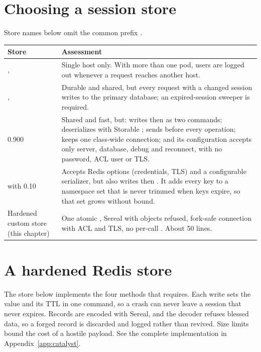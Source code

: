 \section{Choosing a session store}
Store names below omit the common prefix .
\begin{longtable}{L{.26\linewidth}L{.66\linewidth}}\toprule Store & Assessment \\ \midrule\endhead
{},  & Single host only. With more than one pod, users are logged out whenever a request reaches another host. \\
,  & Durable and shared, but every request with a changed session writes to the primary database; an expired-session sweeper is required. \\
 0.900 & Shared and fast, but: writes  then  as two commands; deserializes with Storable ; sends  before every operation; keeps one class-wide connection; and its configuration accepts only server, database, debug and reconnect, with no password, ACL user or TLS. \\
 with  0.10 & Accepts Redis options (credentials, TLS) and a configurable serializer, but also writes  then . It adds every key to a namespace set that is never trimmed when keys expire, so that set grows without bound. \\
Hardened custom store (this chapter) & One atomic , Sereal with objects refused, fork-safe connection with ACL and TLS, no per-call . About 50 lines. \\
\bottomrule\end{longtable}

\section{A hardened Redis store}
The store below implements the four methods that  requires. Each write sets the value and its TTL in one command, so a crash can never leave a session that never expires. Records are encoded with Sereal, and the decoder refuses blessed data, so a forged record is discarded and logged rather than revived. Size limits bound the cost of a hostile payload.
See the complete implementation in Appendix~\ref{app:catalyst}.

